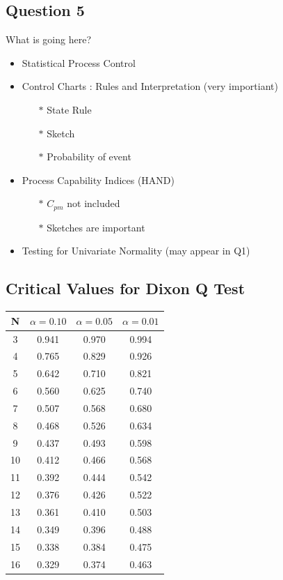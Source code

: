 \documentclass[a4paper,12pt]{article}
\begin{document}
\newpage
\subsection*{Question 5}
\begin{framed}
	What is going here?
\begin{itemize}
\item Statistical Process Control
\item Control Charts : Rules and Interpretation (very importiant)
		\begin{itemize}
			\item[$\ast$] State Rule
			\item[$\ast$] Sketch
			\item[$\ast$] Probability of event
		\end{itemize}
			
\item Process Capability Indices (HAND)
\begin{itemize}
	\item[$\ast$] $C_{pm}$  not included
	\item[$\ast$] Sketches are important
\end{itemize}
\item Testing for Univariate Normality (may appear in Q1)
\end{itemize}
\end{framed}
\newpage

\subsection*{Critical Values for Dixon Q Test}
{
	\Large
	\begin{center}
		\begin{tabular}{|c|c|c|c|}
			\hline  N  & $\alpha=0.10$  & $\alpha=0.05$  & $\alpha=0.01$  \\ \hline
			3  & 0.941 & 0.970 & 0.994 \\ \hline
			4  & 0.765 & 0.829 & 0.926 \\ \hline
			5  & 0.642 & 0.710  & 0.821 \\ \hline
			6  & 0.560 & 0.625 & 0.740 \\ \hline
			7  & 0.507 & 0.568 & 0.680  \\ \hline
			8  & 0.468 & 0.526 & 0.634 \\ \hline
			9  & 0.437 & 0.493 & 0.598 \\ \hline
			10 & 0.412 & 0.466 & 0.568 \\ \hline
			11 & 0.392 & 0.444 & 0.542 \\ \hline
			12 & 0.376 & 0.426 & 0.522 \\ \hline
			13 & 0.361 & 0.410 & 0.503 \\ \hline
			14 & 0.349 & 0.396 & 0.488 \\ \hline
			15 & 0.338 & 0.384 & 0.475 \\ \hline
			16 & 0.329 & 0.374 & 0.463 \\ \hline
		\end{tabular} 
	\end{center}
}
\end{document}
